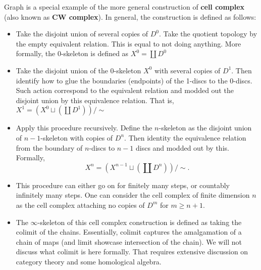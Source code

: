 \documentclass[article,11pt, reqno]{article}
\theoremstyle{remark}
\newcommand{\tb}{\textbf}
\newcommand{\<}{\langle}
\renewcommand{\>}{\rangle}
\begin{document}
Graph is a special example of the more general construction of \tb{cell complex} (also known as \tb{CW complex}). In general, the construction is defined as follows:
\begin{itemize}
    \item Take the disjoint union of several copies of $D^0$. Take the quotient topology by the empty equivalent relation. This is equal to not doing anything. More formally, the $0$-skeleton is defined as $X^0=\coprod D^0$
    \item Take the disjoint union of the $0$-skeleton $X^0$ with several copies of $D^1$. Then identify how to glue the boundaries (endpoints) of the 1-discs to the 0-discs. Such action correspond to the equivalent relation and modded out the disjoint union by this equivalence relation. That is, $X^1=(X^0\sqcup(\coprod D^1))/\sim$
    \item Apply this procedure recursively. Define the $n$-skeleton as the disjoint union of $n-1$-skeleton with copies of $D^n$. Then identity the equivalence relation from the boundary of $n$-discs to $n-1$ discs and modded out by this. Formally,
    $$X^n = (X^{n-1}\sqcup (\coprod D^n))/\sim.$$
    \item This procedure can either go on for finitely many steps, or countably infinitely many steps. One can consider the cell complex of finite dimension $n$ as the cell complex attaching no copies of $D^{m}$ for $m\geq n+1$.
    \item The $\infty$-skeleton of this cell complex construction is defined as taking the colimit of the chains. Essentially, colimit captures the amalgamation of a chain of maps (and limit showcase intersection of the chain). We will not discuss what colimit is here formally. That requires extensive discussion on category theory and some homological algebra.
\end{itemize}
\end{document}
